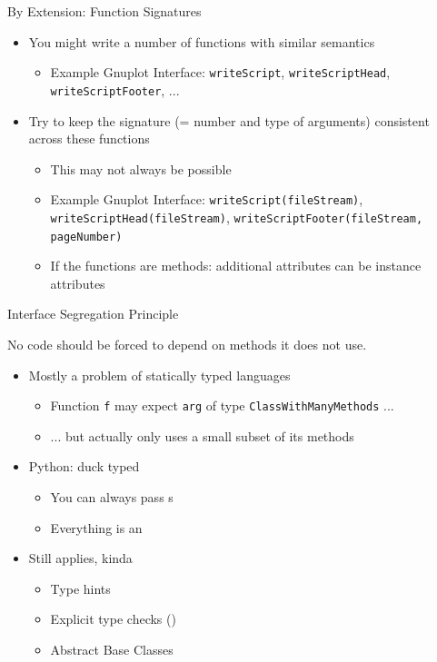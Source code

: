 \begin{frame}{By Extension: Function Signatures}
%
\begin{itemize}
\item You might write a number of functions with similar semantics
	\begin{itemize}
	\item Example Gnuplot Interface: \texttt{writeScript}, \texttt{writeScriptHead}, \texttt{writeScriptFooter}, ...
	\end{itemize}
\item Try to keep the signature (= number and type of arguments) consistent across these functions
	\begin{itemize}
	\item This may not always be possible
	\item Example Gnuplot Interface: \texttt{writeScript(fileStream)}, \texttt{writeScriptHead(fileStream)}, \texttt{writeScriptFooter(fileStream, {\color{red}pageNumber})}
	\item If the functions are methods: additional attributes can be instance attributes
	\end{itemize}
\end{itemize}
%
\end{frame}


\begin{frame}{Interface Segregation Principle}
%
\begin{defbox}[Definition]
\small
No code should be forced to depend on methods it does not use.
\end{defbox}
%
\begin{itemize}
\item Mostly a problem of statically typed languages
	\begin{itemize}
	\item Function \texttt{f} may expect \texttt{arg} of type \texttt{ClassWithManyMethods} ...
	\item ... but actually only uses a small subset of its methods
	\end{itemize}
\item Python: duck typed
	\begin{itemize}
	\item You can always pass s
	\item Everything is an 
	\end{itemize}
\item Still applies, kinda
	\begin{itemize}
	\item Type hints 
	\item Explicit type checks ()
	\item Abstract Base Classes
	\end{itemize}
\end{itemize}
%
\end{frame}

